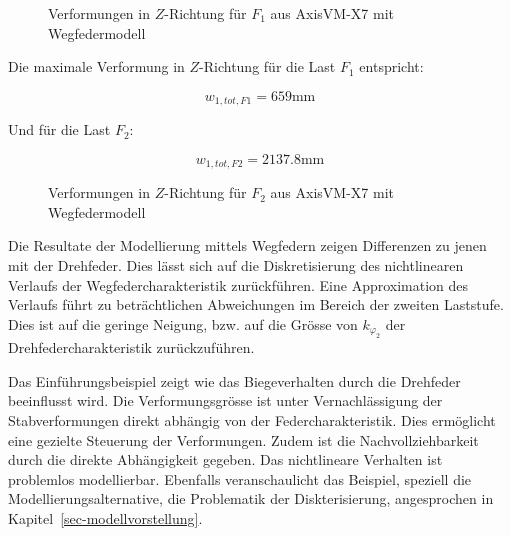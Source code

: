 \documentclass[
  11pt,
  letterpaper,
]{scrreprt}
\begin{document}
\begin{figure}[H]


\caption{\label{fig-f1-wegfeder}Verformungen in \(Z\)-Richtung für
\(F_1\) aus AxisVM-X7 mit Wegfedermodell}

\end{figure}%

Die maximale Verformung in \(Z\)-Richtung für die Last \(F_1\)
entspricht:

\[
w_{1,tot,F1} = 659 \text{mm}
\]

Und für die Last \(F_2\):

\[
w_{1,tot,F2} = 2137.8 \text{mm}
\]

\begin{figure}[H]


\caption{\label{fig-f2-wegfeder}Verformungen in \(Z\)-Richtung für
\(F_2\) aus AxisVM-X7 mit Wegfedermodell}

\end{figure}%

Die Resultate der Modellierung mittels Wegfedern zeigen Differenzen zu
jenen mit der Drehfeder. Dies lässt sich auf die Diskretisierung des
nichtlinearen Verlaufs der Wegfedercharakteristik zurückführen. Eine
Approximation des Verlaufs führt zu beträchtlichen Abweichungen im
Bereich der zweiten Laststufe. Dies ist auf die geringe Neigung, bzw.
auf die Grösse von \(k_{\varphi_2}\) der Drehfedercharakteristik
zurückzuführen.

Das Einführungsbeispiel zeigt wie das Biegeverhalten durch die Drehfeder
beeinflusst wird. Die Verformungsgrösse ist unter Vernachlässigung der
Stabverformungen direkt abhängig von der Federcharakteristik. Dies
ermöglicht eine gezielte Steuerung der Verformungen. Zudem ist die
Nachvollziehbarkeit durch die direkte Abhängigkeit gegeben. Das
nichtlineare Verhalten ist problemlos modellierbar. Ebenfalls
veranschaulicht das Beispiel, speziell die Modellierungsalternative, die
Problematik der Diskterisierung, angesprochen in
Kapitel~\ref{sec-modellvorstellung}.
\end{document}
